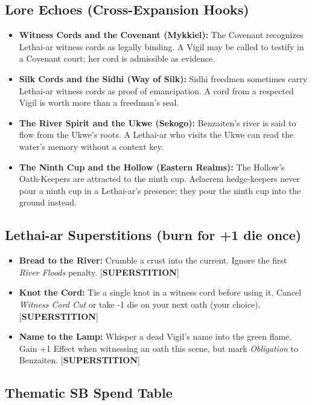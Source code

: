 \subsection*{Lore Echoes (Cross-Expansion Hooks)}
\begin{itemize}
  \item \textbf{Witness Cords and the Covenant (Mykkiel):} The Covenant recognizes Lethai-ar witness cords as legally binding. A Vigil may be called to testify in a Covenant court; her cord is admissible as evidence.
  \item \textbf{Silk Cords and the Sidhi (Way of Silk):} Sidhi freedmen sometimes carry Lethai-ar witness cords as proof of emancipation. A cord from a respected Vigil is worth more than a freedman's seal.
  \item \textbf{The River Spirit and the Ukwe (Sekogo):} Benzaiten's river is said to flow from the Ukwe's roots. A Lethai-ar who visits the Ukwe can read the water's memory without a context key.
  \item \textbf{The Ninth Cup and the Hollow (Eastern Realms):} The Hollow's Oath-Keepers are attracted to the ninth cup. Aelaerem hedge-keepers never pour a ninth cup in a Lethai-ar's presence; they pour the ninth cup into the ground instead.
\end{itemize}

\subsection*{Lethai-ar Superstitions (burn for +1 die once)}
\begin{itemize}
  \item \textbf{Bread to the River:} Crumble a crust into the current. Ignore the first \emph{River Floods} penalty. [\textbf{SUPERSTITION}]
  \item \textbf{Knot the Cord:} Tie a single knot in a witness cord before using it. Cancel \emph{Witness Cord Cut} or take -1 die on your next oath (your choice). [\textbf{SUPERSTITION}]
  \item \textbf{Name to the Lamp:} Whisper a dead Vigil's name into the green flame. Gain +1 Effect when witnessing an oath this scene, but mark \emph{Obligation} to Benzaiten. [\textbf{SUPERSTITION}]
\end{itemize}

\subsection*{Thematic SB Spend Table}
\label{sec:lethai-ar-sb-revised}

